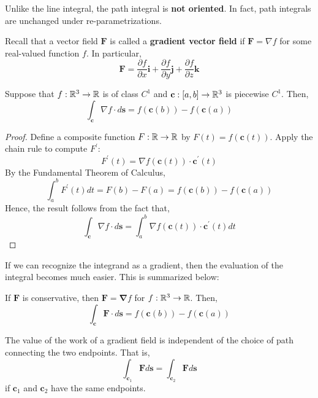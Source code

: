 \begin{rmk}
	Unlike the line integral, the path integral is \textbf{not oriented}. In fact, path integrals are unchanged under re-parametrizations.
\end{rmk}

\hfill

\noindent Recall that a vector field $\mathbf{F}$ is called a \textbf{gradient vector field} if $\mathbf{F} = \nabla f$ for some real-valued function $f$. In particular,
\[\mathbf{F}=\frac{\partial f}{\partial x} \mathbf{i}+\frac{\partial f}{\partial y} \mathbf{j}+\frac{\partial f}{\partial z} \mathbf{k}\]

\hfill

\begin{thm}
	Suppose that $f: \mathbb{R}^3 \rightarrow \mathbb{R}$ is of class $C^1$ and $\mathbf{c}:[a,b] \rightarrow \mathbb{R}^3$ is piecewise $C^1$. Then,
	\[\int_{\mathbf{c}} \nabla f \cdot d \mathbf{s}=f(\mathbf{c}(b))-f(\mathbf{c}(a))\]
\end{thm}

\begin{proof}
	Define a composite function $F: \mathbb{R} \rightarrow \mathbb{R}$ by $F(t) = f(\mathbf{c}(t))$. Apply the chain rule to compute $F^{\prime}$:
	\[F^{\prime}(t) = \nabla f(\mathbf{c}(t)) \cdot \mathbf{c}^{\prime}(t)\]
	By the Fundamental Theorem of Calculus,
	\[\int_a^b F^{\prime}(t) d t=F(b)-F(a)=f(\mathbf{c}(b))-f(\mathbf{c}(a))\]
	Hence, the result follows from the fact that,
	\[\int_{\mathbf{c}} \nabla f \cdot d \mathbf{s}=\int_a^b \nabla f(\mathbf{c}(t)) \cdot \mathbf{c}^{\prime}(t) d t\]
\end{proof}

\hfill

\noindent If we can recognize the integrand as a gradient, then the evaluation of the integral becomes much easier. This is summarized below:

\hfill 

\begin{rmk}
	If $\mathbf{F}$ is conservative, then $\mathbf{F}=\mathbf{\nabla} f$ for $f: \mathbb{R}^3 \rightarrow \mathbb{R}$. Then,
	\[\int_{\mathbf{c}} \mathbf{F} \cdot d \mathbf{s}= f(\mathbf{c}(b))-f(\mathbf{c}(a))\]
\end{rmk}

\begin{cor}
	The value of the work of a gradient field is independent of the choice of path connecting the two endpoints. That is,
	\[\int_{\mathbf{c}_1} \mathbf{F} d\mathbf{s} = \int_{\mathbf{c}_2} \mathbf{F} d\mathbf{s}\]
	if $\mathbf{c}_1$ and $\mathbf{c}_2$ have the same endpoints.
\end{cor}

